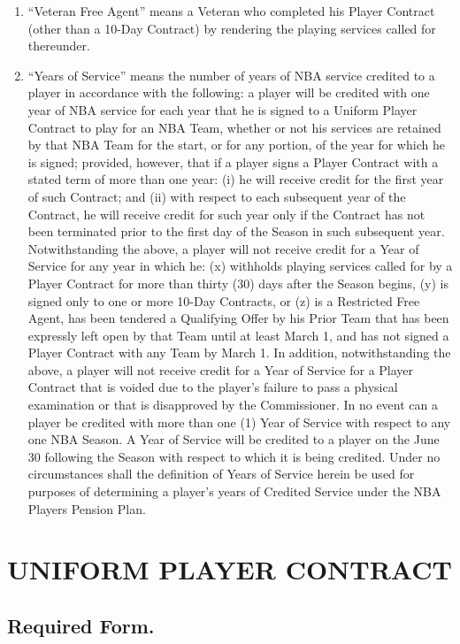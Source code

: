 \documentclass[
]{book}
\begin{document}
\begin{enumerate}
\item
  ``Veteran Free Agent'' means a Veteran who completed his Player Contract (other than a 10-Day Contract) by rendering the playing services called for thereunder.
\item
  ``Years of Service'' means the number of years of NBA service credited to a player in accordance with the following: a player will be credited with one year of NBA service for each year that he is signed to a Uniform Player Contract to play for an NBA Team, whether or not his services are retained by that NBA Team for the start, or for any portion, of the year for which he is signed; provided, however, that if a player signs a Player Contract with a stated term of more than one year: (i) he will receive credit for the first year of such Contract; and (ii) with respect to each subsequent year of the Contract, he will receive credit for such year only if the Contract has not been terminated prior to the first day of the Season in such subsequent year. Notwithstanding the above, a player will not receive credit for a Year of Service for any year in which he: (x) withholds playing services called for by a Player Contract for more than thirty (30) days after the Season begins, (y) is signed only to one or more 10-Day Contracts, or (z) is a Restricted Free Agent, has been tendered a Qualifying Offer by his Prior Team that has been expressly left open by that Team until at least March 1, and has not signed a Player Contract with any Team by March 1. In addition, notwithstanding the above, a player will not receive credit for a Year of Service for a Player Contract that is voided due to the player's failure to pass a physical examination or that is disapproved by the Commissioner. In no event can a player be credited with more than one (1) Year of Service with respect to any one NBA Season. A Year of Service will be credited to a player on the June 30 following the Season with respect to which it is being credited. Under no circumstances shall the definition of Years of Service herein be used for purposes of determining a player's years of Credited Service under the NBA Players Pension Plan.
\end{enumerate}

\hypertarget{uniform-player-contract}{%
\chapter{UNIFORM PLAYER CONTRACT}\label{uniform-player-contract}}

\hypertarget{required-form.}{%
\section{Required Form.}\label{required-form.}}
\end{document}
